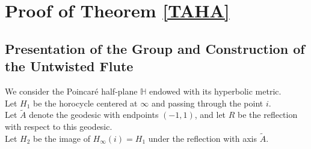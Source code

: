 \documentclass[11pt]{amsart}
\newtheorem{lem}{Lemma}[section]
\begin{document}


\section{Proof of Theorem \ref{TAHA}}

\subsection{Presentation of the Group and Construction of the Untwisted Flute}

We consider the Poincaré half-plane $\mathbb{H}$ endowed with its hyperbolic metric.\\
Let $H_1$ be the horocycle centered at $\infty$ and passing through the point $i$.\\
Let $\tilde{A}$ denote the geodesic with endpoints $(-1, 1)$, and let $R$ be the reflection with respect to this geodesic.\\ 
Let $H_2$ be the image of $H_{\infty}(i) = H_1$ under the reflection with axis $\tilde{A}$.\\
\end{document}
